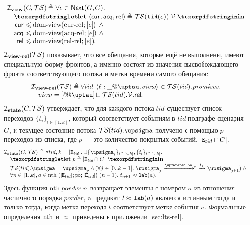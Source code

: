   \[\inarr{
  \invView(C, \TSf) \defeq
  \forall e \in \nextset(G, C). \\
  \quad \letdef{\tup{\viewCur, \viewAcq, \viewfRel}}{\TSf(\lTID(e)).\View} \\
  \quad
  \begin{array}{@{}r@{~}l@{~}l}
    \viewCur & \le \domView(\curRel; [e]) & \land {} \\
    \viewAcq & \le \domView(\acqRel; [e]) & \land {} \\
    \viewfRel & \le \domView(\relRel; [e]). \\
  \end{array}
  }\]
  $\mathcal{I}_{\rm \bf view\text{-}rel}(\mathcal{TS})$ показывает, что все обещания, которые ещё не выполнены, имеют специальную форму
  фронтов, а именно состоят  из значения высвобождающего фронта соответствующего потока и метки времени самого обещания:
  \[\inarr{
  \invViewRel(\TSf) \defeq \forall tid, \msg{\loc}{\_}{\tau}{view} \in \TSf(tid).\PromSet. \\
    \quad view = [\loc @ \tau] \sqcup \TSf(tid).\View.\viewfRel. \\
  }\]
  $\mathcal{I}_{\rm \bf state}(C, \mathcal{TS})$ утверждает, что для каждого потока $tid$ существует список переходов $\{t_i\}_{i \in [1..k]}$,
  который соответствует событиям в $tid$-подграфе сценария $G$, и текущее состояние потока $\TSf(tid).\sigma$
  получено с помощью $p$ переходов из списка, где $p$ --- это количество покрытых событий, $|{\mathtt{E}}_{tid} \cap C|$.
  \[\inarr{
  \invState(C, \TSf) \defeq \forall tid, k = |\lEID|. \;
     \exists \{\pstate_i\}_{i \in [0 .. k]}, \{t_i\}_{i \in [1..k]}. \; \\
  \quad \letdef{p}{|\lEID \cap C|} \\
  \quad \TSf(tid).\pstate = \pstate_{p} \land 
    (\forall j \in [0..k-1]. \; \pstate_j \astep{\epsilon}\!\!^{*}\astep{t_j} \pstate_{j + 1})\land {} \\
  \quad \forall n \in [1..k], a \in \nthf \; ([\lEID]; \lPO; [\lEID]) \; (n - 1). \;
    t_{n + 1} \approx \lLAB(a).
  }\]
  Здесь функция $\mathrm{nth} \; porder \; n$ возвращает
  элементы с номером $n$ из отношения частичного порядка $porder$, 
  a предикат $t \approx {\mathtt{lab}}(a)$ является истинным тогда и только тогда, когда метка перехода $t$
  соответствует метке события $a$.
  Формальные определения  $\mathrm{nth}$ и $\approx$ приведены в приложении \ref{sec:lts-rel}.
